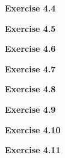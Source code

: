 \documentclass{article}
\begin{document}
\bigskip

\begin{framed}
    \noindent \textbf{Exercise 4.4}
    
    \medskip
    
    
\end{framed}


\bigskip

\begin{framed}
    \noindent \textbf{Exercise 4.5}
    
    \medskip
    
    
\end{framed}


\bigskip

\begin{framed}
    \noindent \textbf{Exercise 4.6}
    
    \medskip
    
    
\end{framed}


\bigskip

\begin{framed}
    \noindent \textbf{Exercise 4.7}
    
    \medskip
    
    
\end{framed}


\bigskip

\begin{framed}
    \noindent \textbf{Exercise 4.8}
    
    \medskip
    
    
\end{framed}


\bigskip

\begin{framed}
    \noindent \textbf{Exercise 4.9}
    
    \medskip
    
    
\end{framed}


\bigskip

\begin{framed}
    \noindent \textbf{Exercise 4.10}
    
    \medskip
    
    
\end{framed}


\bigskip

\begin{framed}
    \noindent \textbf{Exercise 4.11}
    
    \medskip
    
    
\end{framed}
\end{document}
